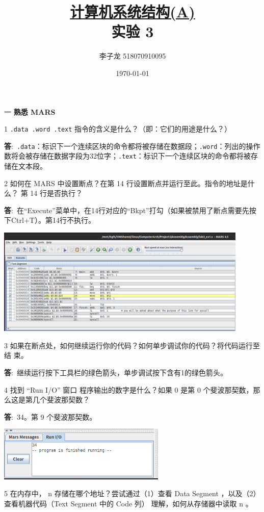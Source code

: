 \documentclass[12pt,a4paper]{article}
\newenvironment{problems}{\begin{list}{}{\renewcommand{\makelabel}[1]{\textbf{##1}.\hfil}}}{\end{list}}
\newenvironment{steps}{\begin{list}{}{\renewcommand{\makelabel}[1]{(##1)\hfil}}}{\end{list}}
\providecommand{\ans}{\textbf{答}:~}
\begin{document}
\title{\normalsize \underline{计算机系统结构(A)}\\\LARGE 实验 3}
\author{李子龙 518070910095}
\date{\today}
\maketitle

\begin{problems}
    \item[一] \textbf{熟悉 MARS}
    \begin{steps}
        \item[1] \verb".data .word .text" 指令的含义是什么？（即：它们的用途是什么？）
         
        \ans \verb".data"：标识下一个连续区块的命令都将被存储在数据段；\verb".word"：列出的操作数将会被存储在数据字段为32位字；\verb".text"：标识下一个连续区块的命令都将被存储在文本段。
        \item[2] 如何在 MARS 中设置断点？在第 14 行设置断点并运行至此。指令的地址是什么？
        第 14 行是否执行？
        
        \ans 在“Execute”菜单中，在14行对应的“Bkpt”打勾（如果被禁用了断点需要先按下Ctrl+T）。第14行不执行。

        \includegraphics[width=0.9\textwidth]{bkpt.png}

        \item[3] 如果在断点处，如何继续运行你的代码？如何单步调试你的代码？将代码运行至结
        束。
        
        \ans 继续运行按下工具栏的绿色箭头，单步调试按下含有1的绿色箭头。
        \item[4] 找到 “Run I/O” 窗口 程序输出的数字是什么？如果 0 是第 0 个斐波那契数，那
        么这是第几个斐波那契数？

        \ans 34。第 9 个斐波那契数。

        \includegraphics[width=0.6\textwidth]{run.png}
        \item[5] 在内存中， n 存储在哪个地址？尝试通过（1）查看 Data Segment ，以及（2）查看机器代码（Text Segment 中的 Code 列） 理解，如何从存储器中读取 n 。
        

\end{steps}
\end{problems}
\end{document}
